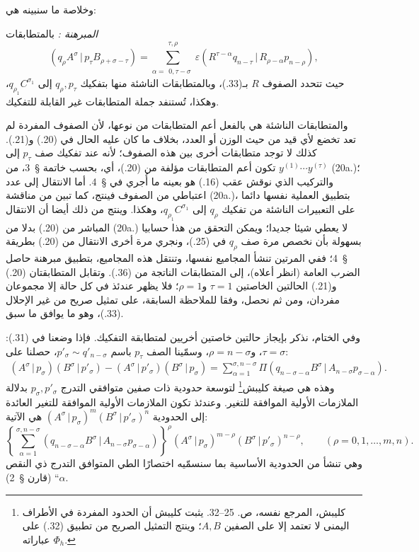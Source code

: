 \documentclass[11pt]{article}
\providecommand{\glqq}{\textquotedblbase}
\providecommand{\grqq}{\textquotedblleft}
\newcommand{\srcLTR}[1]{\relax\ifmmode\text{\mbox{\babelsublr{\foreignlanguage{english}{#1}}}}\else\babelsublr{\foreignlanguage{english}{#1}}\fi}
\providecommand{\pair}[2]{(#1\,|\,#2)}
\providecommand{\eps}{\varepsilon}
\begin{document}
وخلاصة ما سنبينه هي:

\emph{المبرهنة \srcLTR{III}:} بالمتطابقات
\begin{equation}
 \pair{q_\rho A^\sigma}{p_\tau B_{\rho+\sigma-\tau}}
 =\sum_{\alpha=\substack{0,\tau-\sigma}}^{\substack{\tau,\rho}}
 \eps\pair{R^{\tau-\alpha}q_{n-\tau}}{R_{\rho-\alpha}p_{n-\rho}},
\tag{36}
\end{equation}
حيث تتحدد الصفوف $R$ بـ(33.)، وبالمتطابقات الناشئة منها بتفكيك $q_\rho,p_\tau$ إلى $q_{\rho_1}C^{\sigma_1}$، وهكذا، تُستنفد جملة المتطابقات غير القابلة للتفكيك.

والمتطابقات الناشئة هي بالفعل أعم المتطابقات من نوعها، لأن الصفوف المفردة لم تعد تخضع لأي قيد من حيث الوزن أو العدد، بخلاف ما كان عليه الحال في (20.) و(21.). كذلك لا توجد متطابقات أخرى بين هذه الصفوف؛ لأنه عند تفكيك صف $p_\tau$ إلى $y^{(1)}\cdots y^{(\tau)}$ تكون أعم المتطابقات مؤلفة من (20.)، أي، بحسب خاتمة \S\ 3، من (20a.)؛ والتركيب الذي نوقش عقب (16.) هو بعينه ما أُجري في \S\ 4. أما الانتقال إلى عدد اعتباطي من الصفوف فينتج، كما تبين من مناقشة (20a.)، بتطبيق العملية نفسها دائما على التعبيرات الناشئة من تفكيك $q_\rho$ إلى $q_{\rho_1}C^{\sigma_1}$، وهكذا. وينتج من ذلك أيضا أن الانتقال المباشر من (20.) بدلا من (20a.) لا يعطي شيئا جديدا؛ ويمكن التحقق من هذا حسابيا بسهولة بأن نخصص مرة صف $q_\rho$ في (25.)، ونجري مرة أخرى الانتقال من (20.) بطريقة \S\ 4؛ ففي المرتين تنشأ المجاميع نفسها، وتنتقل هذه المجاميع، بتطبيق مبرهنة حاصل الضرب العامة (انظر أعلاه)، إلى المتطابقات الناتجة من (36.). وتقابل المتطابقتان (20.) و(21.) الحالتين الخاصتين $\tau=1$ و$\rho=1$؛ فلا يظهر عندئذ في كل حالة إلا مجموعان مفردان، ومن ثم نحصل، وفقا للملاحظة السابقة، على تمثيل صريح من غير الإحلال (33.)، وهو ما يوافق ما سبق.

وفي الختام، نذكر بإيجاز حالتين خاصتين أخريين لمتطابقة التفكيك. فإذا وضعنا في (31.): $\tau=\sigma$، و$\rho=n-\sigma$، وسمّينا الصف $p_\tau$ باسم $p'_\sigma\sim q'_{n-\sigma}$، حصلنا على:
\begin{equation}
\begin{aligned}
\pair{A^\sigma}{p_\sigma}\pair{B^\sigma}{p'_\sigma}
-\pair{A^\sigma}{p'_\sigma}\pair{B^\sigma}{p_\sigma}
=\sum_{\alpha=1}^{\sigma,n-\sigma}
\Pi\pair{q_{n-\sigma-\alpha}B^\sigma}{A_{n-\sigma}p_{\sigma-\alpha}}.
\end{aligned}
\tag{37}
\end{equation}
وهذه هي صيغة كليبش\footnote{كليبش، المرجع نفسه، ص. 25--32. يثبت كليبش أن الحدود المفردة في الأطراف اليمنى لا تعتمد إلا على الصفين $A,B$؛ وينتج التمثيل الصريح من تطبيق (32.) على عباراته $\Phi_h$.} لتوسعة حدودية ذات صفين متوافقي التدرج $p_\sigma,p'_\sigma$ بدلالة الملازمات الأولية الموافقة للتغير. وعندئذ تكون الملازمات الأولية الموافقة للتغير العائدة إلى الحدودية $\pair{A^\sigma}{p_\sigma}^m\pair{B^\sigma}{p'_\sigma}^n$ هي الآتية:
\begin{equation}
 \left\{\sum_{\alpha=1}^{\sigma,n-\sigma}
 \pair{q_{n-\sigma-\alpha}B^\sigma}{A_{n-\sigma}p_{\sigma-\alpha}}
 \right\}^{\rho}
 \pair{A^\sigma}{p_\sigma}^{m-\rho}\pair{B^\sigma}{p'_\sigma}^{n-\rho},
 \qquad (\rho=0,1,\ldots,m,n).
\tag{38}
\end{equation}
وهي تنشأ من الحدودية الأساسية بما سنسمّيه اختصارًا \glqq{}الطي المتوافق التدرج ذي النقص $\alpha$\grqq{} (قارن \S\ 2).
\end{document}
